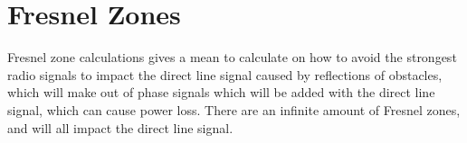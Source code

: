 \chapter{Fresnel Zones}


Fresnel zone \citep{Fres1} \citep{Fres2} calculations gives a mean to calculate on how to avoid the strongest radio signals to impact the direct line signal caused  by reflections of obstacles, which will make out of phase signals which will be added with the direct line signal, which can cause power loss. There are an infinite amount of Fresnel zones, and will all impact the direct line signal.  %


